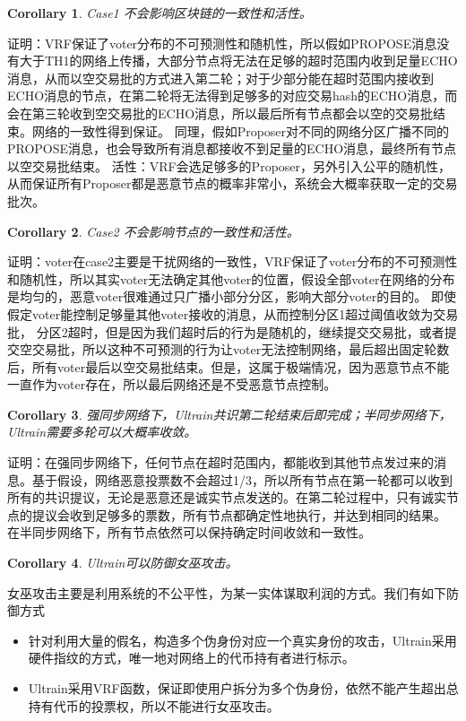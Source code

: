 \documentclass[12pt, UTF8]{article}
\newtheorem{corollary}{Corollary}[theorem]
\begin{document}
\begin{corollary}
Case1 不会影响区块链的一致性和活性。
\end{corollary}
证明：VRF保证了voter分布的不可预测性和随机性，所以假如PROPOSE消息没有大于TH1的网络上传播，大部分节点将无法在足够的超时范围内收到足量ECHO消息，从而以空交易批的方式进入第二轮；对于少部分能在超时范围内接收到ECHO消息的节点，在第二轮将无法得到足够多的对应交易hash的ECHO消息，而会在第三轮收到空交易批的ECHO消息，所以最后所有节点都会以空的交易批结束。网络的一致性得到保证。
同理，假如Proposer对不同的网络分区广播不同的PROPOSE消息，也会导致所有消息都接收不到足量的ECHO消息，最终所有节点以空交易批结束。
活性：VRF会选足够多的Proposer，另外引入公平的随机性，从而保证所有Proposer都是恶意节点的概率非常小，系统会大概率获取一定的交易批次。

\begin{corollary}
Case2 不会影响节点的一致性和活性。
\end{corollary}
证明：voter在case2主要是干扰网络的一致性，VRF保证了voter分布的不可预测性和随机性，所以其实voter无法确定其他voter的位置，假设全部voter在网络的分布是均匀的，恶意voter很难通过只广播小部分分区，影响大部分voter的目的。
即使假定voter能控制足够量其他voter接收的消息，从而控制分区1超过阈值收敛为交易批，
分区2超时，但是因为我们超时后的行为是随机的，继续提交交易批，或者提交空交易批，所以这种不可预测的行为让voter无法控制网络，最后超出固定轮数后，所有voter最后以空交易批结束。但是，这属于极端情况，因为恶意节点不能一直作为voter存在，所以最后网络还是不受恶意节点控制。

\begin{corollary}
强同步网络下，Ultrain共识第二轮结束后即完成；半同步网络下，Ultrain需要多轮可以大概率收敛。
\end{corollary}
证明：在强同步网络下，任何节点在超时范围内，都能收到其他节点发过来的消息。基于假设，网络恶意投票数不会超过1/3，所以所有节点在第一轮都可以收到所有的共识提议，无论是恶意还是诚实节点发送的。在第二轮过程中，只有诚实节点的提议会收到足够多的票数，所有节点都确定性地执行，并达到相同的结果。
在半同步网络下，所有节点依然可以保持确定时间收敛和一致性。

\begin{corollary}
Ultrain可以防御女巫攻击。
\end{corollary}
女巫攻击主要是利用系统的不公平性，为某一实体谋取利润的方式。我们有如下防御方式
\begin{itemize}
\item 针对利用大量的假名，构造多个伪身份对应一个真实身份的攻击，Ultrain采用硬件指纹的方式，唯一地对网络上的代币持有者进行标示。
\item Ultrain采用VRF函数，保证即使用户拆分为多个伪身份，依然不能产生超出总持有代币的投票权，所以不能进行女巫攻击。
\end{itemize}
\end{document}
